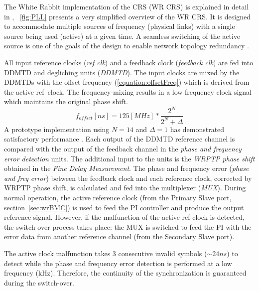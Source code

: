 The White Rabbit implementation of the CRS (WR CRS) is explained in
detail in \cite{biblio:TomekMSc}, \figurename~\ref{fig:PLL} presents
a very simplified overview of the WR CRS. It is designed to accommodate
multiple sources of frequency (physical links) with a single source
being used (active) at a given time. A seamless switching of the
active source is one of the goals of the design to enable network
topology redundancy .


All input reference clocks (\textit{ref clk}) and a feedback clock (\textit{feedback clk}) are
fed into DDMTD and degliching units (\textit{DDMTD}). The input clocks are mixed by the DDMTDs with 
the offset frequency (\ref{equation:offsetFreq}) which is derived from the 
active ref~clock. The frequency-mixing results in a low frequency clock signal which maintains the
original 
phase shift. 
\begin{equation}
  \label{equation:offsetFreq}
     f_{offset}[ns] =  125[MHz] * \frac{2^N}{2^N+ \Delta}%
\end{equation}
A prototype implementation using $N=14$ and $\Delta=1$ has demonstrated satisfactory performance 
\cite{biblio:TomekMSc}. Each output of the DDMTD reference channel is compared with the output
of the feedback channel in the \textit{phase and frequency error detection} units. The additional 
input to the units is the \textit{WRPTP phase shift} obtained in the \textit{Fine Delay
Measurement}. The phase and frequency error (\textit{phase and freq error}) between the feedback
clock and each reference clock, corrected by WRPTP phase shift, is calculated and fed into the
multiplexer (\textit{MUX}).
During normal operation, the active reference clock (from the Primary Slave port, 
section~\ref{sec:wrBMC}) is used to feed the PI controller and produce the output reference signal.
However, if the malfunction of the active ref clock is detected, the switch-over process
takes place: the MUX is switched to feed the PI with the error data from another reference channel
(from the Secondary Slave port).



The active clock malfunction takes 3 consecutive invalid symbols
($\sim24ns$) to detect while the phase and frequency error detection is performed
at a low frequency (kHz). Therefore, the continuity of the synchronization is 
guaranteed during the switch-over. 




